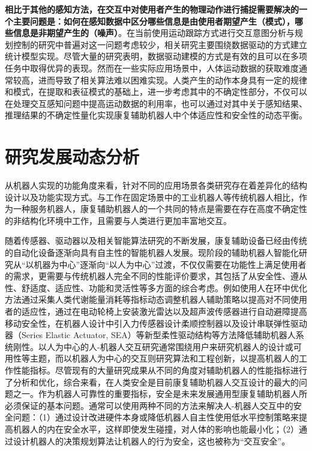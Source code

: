 \textbf{相比于其他的感知方法，在交互中对使用者产生的物理动作进行捕捉需要解决的一个主要问题是：如何在感知数据中区分哪些信息是由使用者期望产生（模式），哪些信息是非期望产生的（噪声）}。在当前使用运动跟踪方式进行交互意图分析与规划控制的研究中普遍对这一问题考虑较少，相关研究主要围绕数据驱动的方式建立统计模型实现。尽管大量的研究表明，数据驱动建模的方式是有效的且可以在多项任务中取得优异的表现。然而在一些实际应用场景中，人体运动数据的获取难度通常较高，进而导致了相关算法难以困难实现。人类产生的动作本身具有一定的规律和模式，在提取和表征模式的基础上，进一步考虑其中的不确定性部分，不仅可以在处理交互感知问题中提高运动数据的利用率，也可以通过对其中关于感知结果、推理结果的不确定性量化实现康复辅助机器人中个体适应性和安全性的动态平衡。

\section{研究发展动态分析}
从机器人实现的功能角度来看，针对不同的应用场景各类研究存在着差异化的结构设计以及功能实现方式。与工作在固定场景中的工业机器人等传统机器人相比，作为一种服务机器人，康复辅助机器人的一个共同的特点是需要在存在高度不确定性的非结构化环境中工作，且需要与人类进行更加丰富地交互。

随着传感器、驱动器以及相关智能算法研究的不断发展，康复辅助设备已经由传统的自动化设备逐渐向具有自主性的智能机器人发展。现阶段的辅助机器人智能化研究从``以机器为中心''逐渐向``以人为中心''过渡，不仅仅需要在功能性上满足使用者的需求，更需要与传统机器人完全不同的性能评价要求，其包括了从安全性、遵从性、舒适度、适应性、功能和灵活性等多方面的综合考虑\cite{heSurveyHumancenteredIntelligent2017b}。例如使用人在环中优化方法\cite{dingHumanintheloopOptimizationHip2018,zhangHumanintheloopOptimizationExoskeleton2017a,awadSoftRoboticExosuit2017}通过采集人类代谢能量消耗等指标动态调整机器人辅助策略以提高对不同使用者的适应性，通过在电动轮椅上安装激光雷达以及超声波传感器进行自动避障提高移动安全性\cite{fosterReflectanceFieldMap2023,parkDiscretetimeDynamicModeling2017,walterFrameworkLearningSemantic2014}，在机器人设计中引入力传感器设计柔顺控制器\cite{hong-guljunWalkingSittostandSupport2011,inhokimKinematicAnalysisSittostand2011}以及设计串联弹性驱动器（Series Elastic Actuator, SEA）等新型柔性驱动结构\cite{zhongGaitSymmetryEnhancement2022}等方法降低辅助机器人系统刚性。以人为中心的人-机器人交互研究通常围绕用户来研究机器人的设计或可用性等主题，而以机器人为中心的交互则研究算法和工程创新，以提高机器人的工作性能指标。尽管现有的大量研究成果从不同的角度对辅助机器人的性能指标进行了分析和优化，综合来看，在人类安全是目前康复辅助机器人交互设计的最大的问题之一\cite{tadeleSafetyDomesticRobotics2014}。作为机器人可靠性的重要指标，安全是未来发展通用型康复辅助机器人所必须保证的基本问题。通常可以使用两种不同的方法来解决人-机器人交互中的安全问题：（1）通过设计改进硬件本身或降低机器人自主性使用低水平控制策略来提高机器人的内在安全水平，这样即使发生碰撞，对人体的影响也能最小化\cite{haddadinNewInsightsConcerning2010}；（2）通过设计机器人的决策规划算法让机器人的行为安全，这也被称为``交互安全''\cite{liuDesigningRobotBehavior}。


